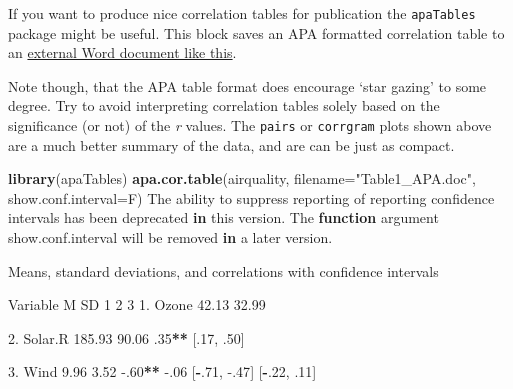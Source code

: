 \documentclass[]{article}
\newenvironment{Shaded}{\begin{snugshade}}{\end{snugshade}}
\newcommand{\ControlFlowTok}[1]{\textcolor[rgb]{0.13,0.29,0.53}{\textbf{#1}}}
\newcommand{\DataTypeTok}[1]{\textcolor[rgb]{0.13,0.29,0.53}{#1}}
\newcommand{\DecValTok}[1]{\textcolor[rgb]{0.00,0.00,0.81}{#1}}
\newcommand{\FloatTok}[1]{\textcolor[rgb]{0.00,0.00,0.81}{#1}}
\newcommand{\KeywordTok}[1]{\textcolor[rgb]{0.13,0.29,0.53}{\textbf{#1}}}
\newcommand{\NormalTok}[1]{#1}
\newcommand{\OperatorTok}[1]{\textcolor[rgb]{0.81,0.36,0.00}{\textbf{#1}}}
\newcommand{\StringTok}[1]{\textcolor[rgb]{0.31,0.60,0.02}{#1}}
\begin{document}
If you want to produce nice correlation tables for publication the \texttt{apaTables}
package might be useful. This block saves an APA formatted correlation table to
an \href{Table1_APA.doc}{external Word document like this}.

Note though, that the APA table format does encourage `star gazing' to some
degree. Try to avoid interpreting correlation tables solely based on the
significance (or not) of the \emph{r} values. The \texttt{pairs} or \texttt{corrgram} plots shown
above are a much better summary of the data, and are can be just as compact.

\begin{Shaded}
\begin{Highlighting}[]
\KeywordTok{library}\NormalTok{(apaTables)}
\KeywordTok{apa.cor.table}\NormalTok{(airquality, }\DataTypeTok{filename=}\StringTok{"Table1_APA.doc"}\NormalTok{, }\DataTypeTok{show.conf.interval=}\NormalTok{F)}
\NormalTok{The ability to suppress reporting of reporting confidence intervals has been deprecated }\ControlFlowTok{in}\NormalTok{ this version.}
\NormalTok{The }\ControlFlowTok{function}\NormalTok{ argument show.conf.interval will be removed }\ControlFlowTok{in}\NormalTok{ a later version.}


\NormalTok{Means, standard deviations, and correlations with confidence intervals}
 

\NormalTok{  Variable   M      SD    }\DecValTok{1}            \DecValTok{2}           \DecValTok{3}           
  \FloatTok{1.}\NormalTok{ Ozone   }\FloatTok{42.13}  \FloatTok{32.99}                                      
                                                               
  \FloatTok{2.}\NormalTok{ Solar.R }\FloatTok{185.93} \FloatTok{90.06} \FloatTok{.35}\OperatorTok{**}\StringTok{                                }
\StringTok{                          }\NormalTok{[.}\DecValTok{17}\NormalTok{, }\FloatTok{.50}\NormalTok{]                           }
                                                               
  \FloatTok{3.}\NormalTok{ Wind    }\FloatTok{9.96}   \FloatTok{3.52}  \FloatTok{-.60}\OperatorTok{**}\StringTok{       }\FloatTok{-.06}                    
\NormalTok{                          [}\OperatorTok{-}\NormalTok{.}\DecValTok{71}\NormalTok{, }\FloatTok{-.47}\NormalTok{] [}\OperatorTok{-}\NormalTok{.}\DecValTok{22}\NormalTok{, }\FloatTok{.11}\NormalTok{]             }
                                                               

\end{Highlighting}
\end{Shaded}
\end{document}
